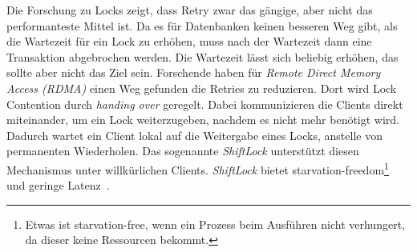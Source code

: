 Die Forschung zu Locks zeigt, dass Retry zwar das gängige, aber nicht das performanteste Mittel ist.
Da es für Datenbanken keinen besseren Weg gibt, als die Wartezeit für ein Lock zu erhöhen, muss nach der Wartezeit dann
eine Transaktion abgebrochen werden.
Die Wartezeit lässt sich beliebig erhöhen, das sollte aber nicht das Ziel sein.
Forschende haben für \emph{Remote Direct Memory Access (RDMA)} einen Weg gefunden die Retries zu reduzieren.
Dort wird Lock Contention durch \emph{handing over} geregelt.
Dabei kommunizieren die Clients direkt miteinander, um ein Lock weiterzugeben, nachdem es nicht mehr benötigt wird.
Dadurch wartet ein Client lokal auf die Weitergabe eines Locks, anstelle von permanenten Wiederholen.
Das sogenannte \emph{ShiftLock} unterstützt diesen Mechanismus unter willkürlichen Clients.
\emph{ShiftLock} bietet starvation-freedom\footnote{Etwas ist starvation-free, wenn ein Prozess beim Ausführen
	nicht verhungert, da dieser keine Ressourcen bekommt.} und geringe Latenz~\cite{Gao2025ShiftLock}.
